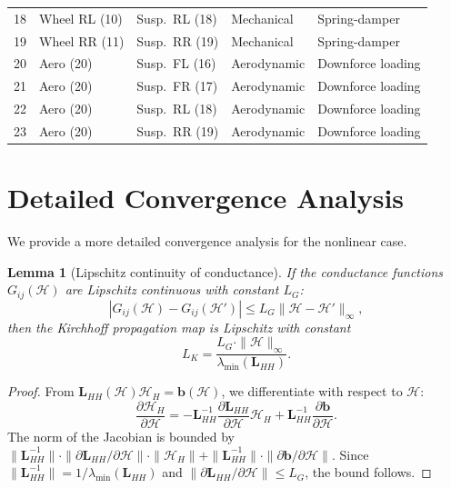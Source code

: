 \documentclass[twocolumn,10pt,a4paper]{article}
\newtheorem{lemma}[theorem]{Lemma}
\theoremstyle{definition}
\theoremstyle{remark}
\newcommand{\Hcal}{\mathcal{H}}
\newcommand{\vect}[1]{\boldsymbol{#1}}
\newcommand{\mat}[1]{\mathbf{#1}}
\begin{document}
\begin{longtable}{@{}cllll@{}}
18 & Wheel RL (10)    & Susp.\ RL (18)   & Mechanical           & Spring-damper \\
19 & Wheel RR (11)    & Susp.\ RR (19)   & Mechanical           & Spring-damper \\
20 & Aero (20)        & Susp.\ FL (16)   & Aerodynamic          & Downforce loading \\
21 & Aero (20)        & Susp.\ FR (17)   & Aerodynamic          & Downforce loading \\
22 & Aero (20)        & Susp.\ RL (18)   & Aerodynamic          & Downforce loading \\
23 & Aero (20)        & Susp.\ RR (19)   & Aerodynamic          & Downforce loading \\
\end{longtable}


\section{Detailed Convergence Analysis}\label{app:convergence}

We provide a more detailed convergence analysis for the nonlinear case.

\begin{lemma}[Lipschitz continuity of conductance]\label{lem:lip_cond}
If the conductance functions $G_{ij}(\vect{\Hcal})$ are Lipschitz continuous with constant $L_G$:
\begin{equation}
    |G_{ij}(\vect{\Hcal}) - G_{ij}(\vect{\Hcal}')| \leq L_G \|\vect{\Hcal} - \vect{\Hcal}'\|_\infty,
\end{equation}
then the Kirchhoff propagation map is Lipschitz with constant
\begin{equation}
    L_K = \frac{L_G \cdot \|\vect{\Hcal}\|_\infty}{\lambda_{\min}(\mat{L}_{HH})}.
\end{equation}
\end{lemma}

\begin{proof}
From $\mat{L}_{HH}(\vect{\Hcal})\vect{\Hcal}_H = \vect{b}(\vect{\Hcal})$, we differentiate with respect to $\vect{\Hcal}$:
\begin{equation}
    \frac{\partial \vect{\Hcal}_H}{\partial \vect{\Hcal}} = -\mat{L}_{HH}^{-1} \frac{\partial \mat{L}_{HH}}{\partial \vect{\Hcal}} \vect{\Hcal}_H + \mat{L}_{HH}^{-1} \frac{\partial \vect{b}}{\partial \vect{\Hcal}}.
\end{equation}
The norm of the Jacobian is bounded by $\|\mat{L}_{HH}^{-1}\| \cdot \|\partial\mat{L}_{HH}/\partial\vect{\Hcal}\| \cdot \|\vect{\Hcal}_H\| + \|\mat{L}_{HH}^{-1}\| \cdot \|\partial\vect{b}/\partial\vect{\Hcal}\|$. Since $\|\mat{L}_{HH}^{-1}\| = 1/\lambda_{\min}(\mat{L}_{HH})$ and $\|\partial\mat{L}_{HH}/\partial\vect{\Hcal}\| \leq L_G$, the bound follows.
\end{proof}
\end{document}
